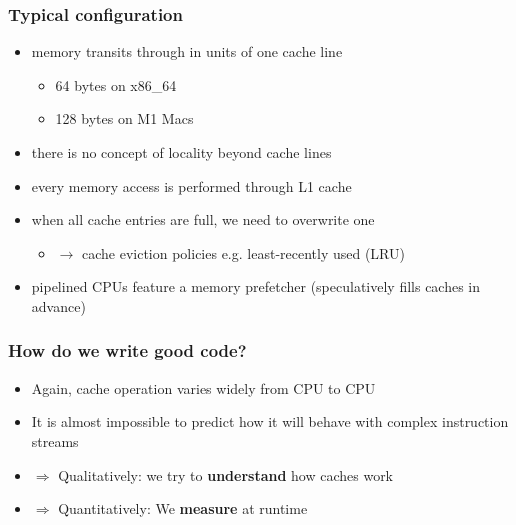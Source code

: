 \documentclass[12pt]{article}
\begin{document}
\subsubsection{Typical configuration}

\begin{itemize}
    \item memory transits through in units of one cache line
    \begin{itemize}
        \item 64 bytes on x86\_64
        \item 128 bytes on M1 Macs
    \end{itemize}
    \item there is no concept of locality beyond cache lines
    \item every memory access is performed through L1 cache
    \item when all cache entries are full, we need to overwrite one
    \begin{itemize}
        \item $\rightarrow$ cache eviction policies e.g. least-recently used (LRU)
    \end{itemize}
    \item pipelined CPUs feature a memory prefetcher (speculatively fills caches in advance)
\end{itemize}

\subsubsection{How do we write good code?}

\begin{itemize}
    \item Again, cache operation varies widely from CPU to CPU
    \item It is almost impossible to predict how it will behave with complex instruction streams
    \item $\Rightarrow$ Qualitatively: we try to \textbf{understand} how caches work
    \item $\Rightarrow$ Quantitatively: We \textbf{measure} at runtime
\end{itemize}
\end{document}
